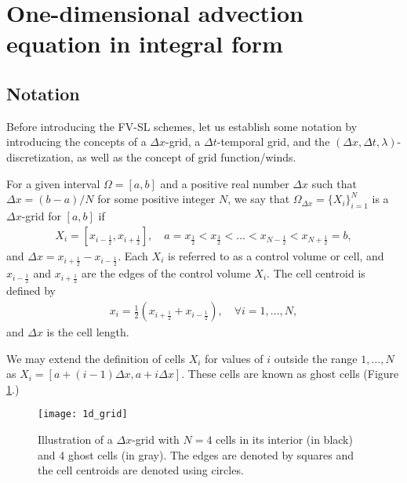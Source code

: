 \section{One-dimensional advection equation in integral form}
\label{chp2-sec1}
\subsection{Notation}
\label{chp2-sec-not}
Before introducing the FV-SL schemes, let us establish some notation by introducing
the concepts of a $\Delta x$-grid, a $\Delta t$-temporal grid, and the
$(\Delta x, \Delta t, \lambda)$-discretization, as well as the concept of grid function/winds.
\begin{definition}
	For a given interval $\Omega = [a,b]$ and a positive real number $\Delta x$ such that 
    $\Delta x = (b-a)/N$ for some positive integer $N$, 
	we say that $\Omega_{\Delta x}= \{X_i \}_{i=1}^{N}$ is a $\Delta x$-grid for $[a,b]$ if
	\begin{align*}
        X_i = [x_{i-\frac{1}{2}}, x_{i+\frac{1}{2}}],
	    \quad a = x_{\frac{1}{2}} < x_{\frac{3}{2}} < \ldots < x_{N-\frac{1}{2}} < x_{N+\frac{1}{2}} = b,
    \end{align*}
	and $\Delta x = x_{i+\frac{1}{2}} - x_{i-\frac{1}{2}}$. 
	Each $X_i$ is referred to as a control volume or cell, and $x_{i-\frac{1}{2}}$ and 
	$x_{i+\frac{1}{2}}$ are the edges of the control volume $X_i$.
	The cell centroid is defined by
    \begin{align*}
    x_i = \frac{1}{2}(x_{i+\frac{1}{2}} + x_{i-\frac{1}{2}}),\quad \forall i = 1, \ldots, N,
    \end{align*}
	and $\Delta x$ is the cell length.
\end{definition}
\begin{remark}
	We may extend the definition of cells $X_i$ for values of $i$ outside the range $1,\ldots,N$ as $X_i = [a+(i-1)\Delta x, a+i\Delta x]$.
	These cells are known as ghost cells (Figure \ref{chp2-sec1-grid1d}.)
\end{remark}

\begin{figure}[!htb]
	\centering
	\texttt{[image: 1d\_grid]}
	\caption{Illustration of a $\Delta x$-grid with $N=4$ cells in its interior (in black) 
	 and 4 ghost cells (in gray).
	 The edges are denoted by squares and the cell centroids are denoted using circles.\label{chp2-sec1-grid1d}}
\end{figure}

